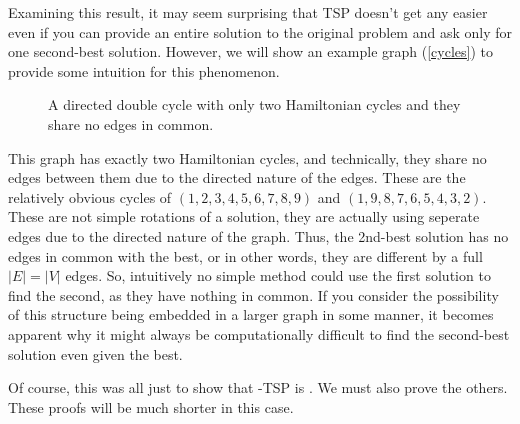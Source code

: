 Examining this result, it may seem surprising that TSP doesn't get any easier even if you can provide an entire solution to the original problem and ask only for one second-best solution. However, we will show an example graph (\autoref{cycles}) to provide some intuition for this phenomenon. 
\begin{figure}[!ht]
	\centering
	\caption{A directed double cycle with only two Hamiltonian cycles and they share no edges in common.}\label{cycles}
\end{figure}
This graph has exactly two Hamiltonian cycles, and technically, they share no edges between them due to the directed nature of the edges. These are the relatively obvious cycles of $(1,2,3,4,5,6,7,8,9)$ and $(1,9,8,7,6,5,4,3,2)$. These are not simple rotations of a solution, they are actually using seperate edges due to the directed nature of the graph. Thus, the 2nd-best solution has no edges in common with the best, or in other words, they are different by a full $|E| = |V|$ edges. So, intuitively no simple method could use the first solution to find the second, as they have nothing in common. If you consider the possibility of this structure being embedded in a larger graph in some manner, it becomes apparent why it might always be computationally difficult  to find the second-best solution even given the best. 

Of course, this was all just to show that \inob{}-TSP is \nph. We must also prove the others. These proofs will be much shorter in this case.

